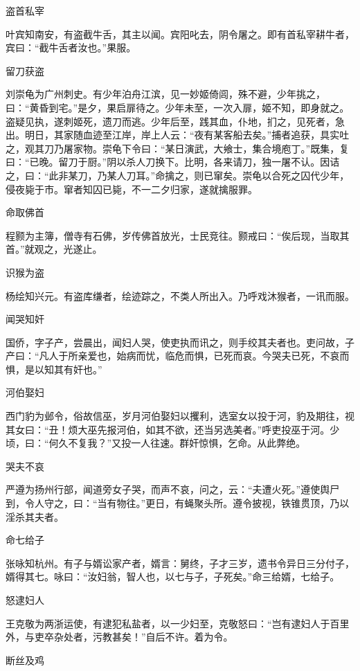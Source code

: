 \documentclass[a4paper,12pt,UTF8,twoside]{ctexbook}
\begin{document}
    盗首私宰
    
    叶宾知南安，有盗截牛舌，其主以闻。宾阳叱去，阴令屠之。即有首私宰耕牛者，宾曰：“截牛舌者汝也。”果服。
    
    留刀获盗
    
    刘崇龟为广州刺史。有少年泊舟江滨，见一妙姬倚闾，殊不避，少年挑之，曰：“黄昏到宅。”是夕，果启扉待之。少年未至，一次入扉，姬不知，即身就之。盗疑见执，遂刺姬死，遗刀而逃。少年后至，践其血，仆地，扪之，见死者，急出。明日，其家随血迹至江岸，岸上人云：“夜有某客船去矣。”捕者追获，具实吐之，观其刀乃屠家物。崇龟下令曰：“某日演武，大飨士，集合境庖丁。”既集，复曰：“已晚。留刀于厨。”阴以杀人刀换下。比明，各来请刀，独一屠不认。因诘之，曰：“此非某刀，乃某人刀耳。”命擒之，则已窜矣。崇龟以合死之囚代少年，侵夜毙于市。窜者知囚已毙，不一二夕归家，遂就擒服罪。
    
    命取佛首
    
    程颢为主簿，僧寺有石佛，岁传佛首放光，士民竞往。颢戒曰：“俟后现，当取其首。”就观之，光遂止。
    
    识猴为盗
    
    杨绘知兴元。有盗库缣者，绘迹踪之，不类人所出入。乃呼戏沐猴者，一讯而服。
    
    闻哭知奸
    
    国侨，字子产，尝晨出，闻妇人哭，使吏执而讯之，则手绞其夫者也。吏问故，子产曰：“凡人于所亲爱也，始病而忧，临危而惧，已死而哀。今哭夫已死，不哀而惧，是以知其有奸也。”
    
    河伯娶妇
    
    西门豹为邺令，俗故信巫，岁月河伯娶妇以攫利，选室女以投于河，豹及期往，视其女曰：“丑！烦大巫先报河伯，如其不欲，还当另选美者。”呼吏投巫于河。少顷，曰：“何久不复我？”又投一人往速。群奸惊惧，乞命。从此弊绝。
    
    哭夫不哀
    
    严遵为扬州行部，闻道旁女子哭，而声不哀，问之，云：“夫遭火死。”遵使舆尸到，令人守之，曰：“当有物往。”更日，有蝇聚头所。遵令披视，铁锥贯顶，乃以淫杀其夫者。
    
    命七给子
    
    张咏知杭州。有子与婿讼家产者，婿言：舅终，子才三岁，遗书令异日三分付子，婿得其七。咏曰：“汝妇翁，智人也，以七与子，子死矣。”命三给婿，七给子。
    
    怒逮妇人
    
    王克敬为两浙运使，有逮犯私盐者，以一少妇至，克敬怒曰：“岂有逮妇人于百里外，与吏卒杂处者，污教甚矣！”自后不许。着为令。
    
    断丝及鸡
    
\end{document}

